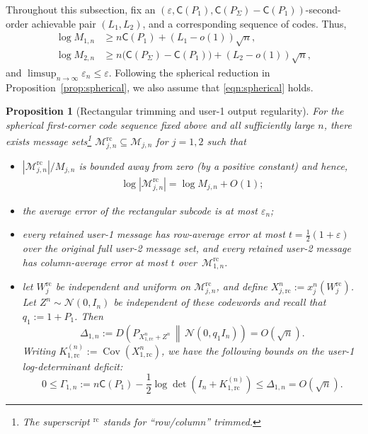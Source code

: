 \documentclass[11pt,onecolumn]{IEEEtran}
\newcommand{\calM}{\mathcal{M}}
\newcommand{\calN}{\mathcal{N}}
\newcommand{\rvC}{\mathsf{C}}
\newcommand{\eps}{\varepsilon}
\newtheorem{proposition}[theorem]{Proposition}
\newcommand{\rc}{\mathrm{rc}}
\begin{document}
Throughout this subsection, fix an
$(\eps,\rvC(P_1),\rvC(P_\Sigma)-\rvC(P_1) )$-second-order achievable pair \((L_1,L_2)\), and a corresponding sequence
of codes. Thus, %
\begin{align}
\log M_{1,n}
&\ge n\rvC(P_1)+(L_1-o(1))\sqrt n, \label{eqn:standing-rate1}\\
\log M_{2,n}
&\ge n\bigl(\rvC(P_\Sigma)-\rvC(P_1)\bigr)
 +(L_2-o(1))\sqrt n, \label{eqn:standing-rate2}
\end{align}
and $\limsup_{n\to\infty}\eps_n\le\eps$.
Following the spherical reduction in Proposition~\ref{prop:spherical},
we also assume   that \eqref{eqn:spherical} holds. 
\begin{proposition}[Rectangular trimming and user-1 output regularity] \label{prop:trim1}
For the spherical first-corner code sequence fixed above and all
sufficiently large \(n\),   there exists message sets\footnote{The superscript $^{\rc}$ stands for ``row/column'' trimmed.} $\calM_{j,n}^{\rc}\subseteq\calM_{j,n}$ for $j =1,2$ such that 
\begin{itemize}
\item[(i)] $|\calM_{j,n}^{\rc}|/ M_{j,n}$ is bounded away from zero (by a positive constant) and  hence,
\begin{align}
\log |\calM_{j,n}^{\rc}|= \log M_{j,n} +O(1) ; \label{eqn:large_subcode}
\end{align}
\item[(ii)] the average error of the rectangular subcode is at most $\eps_n$;
\item[(iii)] every retained user-1 message has row-average error at most $t=\frac{1}{2}( 1+\eps)$   over the original full user-2
message set, and every retained user-2 message has column-average error at most $t$ over~$\calM_{1,n}^{\rc}$. 
\item[(iv)] let \(W_j^{\rc}\) be independent and uniform on
\(\calM_{j,n}^{\rc}\), and define
\(X_{j,\rc}^n:=x_j^n(W_j^{\rc})\). Let
\(Z^n\sim\calN(0,I_n)\) be independent of these codewords and recall that 
\(q_1:=1+P_1\). Then
\begin{equation}
\Delta_{1,n}
:=
D\!\left(
P_{X_{1,\rc}^n+Z^n}
\,\middle\|\,
\calN(0,q_1I_n)
\right)
=O(\sqrt n).\label{eqn:Delta1}
\end{equation}
Writing
\(K_{1,\rc}^{(n)}:=\operatorname{Cov}(X_{1,\rc}^n)\), we have the following bounds on the user-1 log-determinant deficit:
\begin{equation}
0\le\Gamma_{1,n}
:=
n\rvC(P_1)
-\frac12\log\det(I_n+K_{1,\rc}^{(n)})
\le\Delta_{1,n}
=O(\sqrt n).
\end{equation}


\end{itemize}
\end{proposition}
\end{document}
